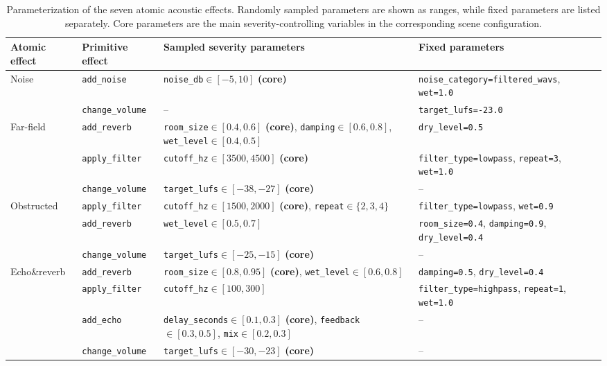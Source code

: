 \documentclass{article}
\begin{document}
\begin{table}[t]
\centering
\scriptsize
\setlength{\tabcolsep}{3.5pt}
\renewcommand{\arraystretch}{1.18}
\caption{Parameterization of the seven atomic acoustic effects. Randomly sampled parameters are shown as ranges, while fixed parameters are listed separately. Core parameters are the main severity-controlling variables in the corresponding scene configuration.}
\label{tab:atomic_effect_parameters}
\begin{tabular}{p{} p{} p{} p{}}
\toprule
\textbf{Atomic effect} & \textbf{Primitive effect} & \textbf{Sampled severity parameters} & \textbf{Fixed parameters} \\
\midrule

\multirow{2}{*}{Noise}
& \texttt{add\_noise}
& \texttt{noise\_db}$\in[-5,10]$ \textbf{(core)}
& \texttt{noise\_category=filtered\_wavs}, \texttt{wet=1.0} \\
& \texttt{change\_volume}
& --
& \texttt{target\_lufs=-23.0} \\

\midrule
\multirow{3}{*}{Far-field}
& \texttt{add\_reverb}
& \texttt{room\_size}$\in[0.4,0.6]$ \textbf{(core)}, \texttt{damping}$\in[0.6,0.8]$, \texttt{wet\_level}$\in[0.4,0.5]$
& \texttt{dry\_level=0.5} \\
& \texttt{apply\_filter}
& \texttt{cutoff\_hz}$\in[3500,4500]$ \textbf{(core)}
& \texttt{filter\_type=lowpass}, \texttt{repeat=3}, \texttt{wet=1.0} \\
& \texttt{change\_volume}
& \texttt{target\_lufs}$\in[-38,-27]$ \textbf{(core)}
& -- \\

\midrule
\multirow{3}{*}{Obstructed}
& \texttt{apply\_filter}
& \texttt{cutoff\_hz}$\in[1500,2000]$ \textbf{(core)}, \texttt{repeat}$\in\{2,3,4\}$
& \texttt{filter\_type=lowpass}, \texttt{wet=0.9} \\
& \texttt{add\_reverb}
& \texttt{wet\_level}$\in[0.5,0.7]$
& \texttt{room\_size=0.4}, \texttt{damping=0.9}, \texttt{dry\_level=0.4} \\
& \texttt{change\_volume}
& \texttt{target\_lufs}$\in[-25,-15]$ \textbf{(core)}
& -- \\

\midrule
\multirow{4}{*}{Echo\&reverb}
& \texttt{add\_reverb}
& \texttt{room\_size}$\in[0.8,0.95]$ \textbf{(core)}, \texttt{wet\_level}$\in[0.6,0.8]$
& \texttt{damping=0.5}, \texttt{dry\_level=0.4} \\
& \texttt{apply\_filter}
& \texttt{cutoff\_hz}$\in[100,300]$
& \texttt{filter\_type=highpass}, \texttt{repeat=1}, \texttt{wet=1.0} \\
& \texttt{add\_echo}
& \texttt{delay\_seconds}$\in[0.1,0.3]$ \textbf{(core)}, \texttt{feedback}$\in[0.3,0.5]$, \texttt{mix}$\in[0.2,0.3]$
& -- \\
& \texttt{change\_volume}
& \texttt{target\_lufs}$\in[-30,-23]$ \textbf{(core)}
& -- \\


\end{tabular}
\end{table}
\end{document}
